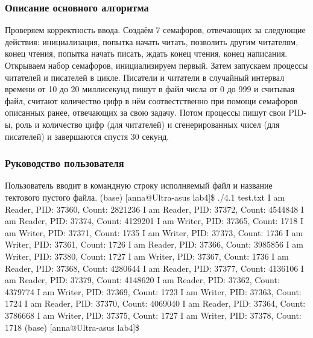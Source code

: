 \documentclass[a4paper,12pt]{extarticle}
\begin{document}
\subsubsection{Описание основного алгоритма}
Проверяем корректность ввода. Создаём 7 семафоров, отвечающих за следующие действия: инициализация,
попытка начать читать, позволить другим читателям, конец чтения, попытка начать писать, ждать конец чтения, конец написания. Открываем набор семафоров, инициализируем первый. Затем запускаем процессы читателей и писателей в цикле. Писатели и читатели в случайный интервал времени от 10 до 20 миллисекунд пишут в файл числа от 0 до 999 и считывая файл, считают количество цифр в нём соотвестственно при помощи семафоров описанных ранее, отвечающих за свою задачу. Потом процессы пишут свои PID-ы, роль и количество цифр (для читателей) и сгенерированных чисел (для писателей) и завершаются спустя 30 секунд.

\subsubsection{Руководство пользователя}
Пользователь вводит в командную строку исполняемый файл и название тектового пустого файла. \newline
(base) [anna@Ultra-asus lab4]\$ ./4.1 test.txt \newline
I am  Reader, PID: 37360, Count: 2821236\newline
I am  Reader, PID: 37372, Count: 4544848\newline
I am  Reader, PID: 37374, Count: 4129201\newline
I am  Writer, PID: 37365, Count: 1718\newline
I am  Writer, PID: 37371, Count: 1735\newline
I am  Writer, PID: 37373, Count: 1736\newline
I am  Writer, PID: 37361, Count: 1726\newline
I am  Reader, PID: 37366, Count: 3985856\newline
I am  Writer, PID: 37380, Count: 1727\newline
I am  Writer, PID: 37367, Count: 1736\newline
I am  Reader, PID: 37368, Count: 4280644\newline
I am  Reader, PID: 37377, Count: 4136106\newline
I am  Reader, PID: 37379, Count: 4148620\newline
I am  Reader, PID: 37362, Count: 4379774\newline
I am  Writer, PID: 37369, Count: 1723\newline
I am  Writer, PID: 37363, Count: 1724\newline
I am  Reader, PID: 37370, Count: 4069040\newline
I am  Reader, PID: 37364, Count: 3786668\newline
I am  Writer, PID: 37375, Count: 1727\newline
I am  Writer, PID: 37378, Count: 1718\newline
(base) [anna@Ultra-asus lab4]\$
\end{document}
